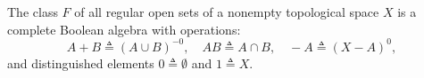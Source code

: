 The class $F$ of all regular open sets of a nonempty topological space $X$ is a complete Boolean algebra with operations:
$$A + B \triangleq (A \cup B)^{-0}, \quad AB \triangleq A \cap B, \quad -A \triangleq (X - A)^0,$$
and distinguished elements $0 \triangleq \emptyset$ and $1 \triangleq X$.
